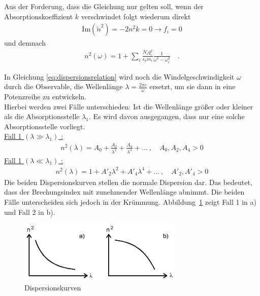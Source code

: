 Aus der Forderung, dass die Gleichung nur gelten soll, wenn der Absorptionskoeffizient $k$ verschwindet folgt wiederum direkt
\begin{align}
\text{Im}\left( \tilde{n}^2 \right) = -2 n^2 k = 0 \rightarrow f_i = 0
\end{align}
und demnach
\begin{align} \label{eq:dispersionsrelation}
n^2(\omega) = 1 + \sum_{i} \frac{N_i q_i^2}{\epsilon_0 m_i} \frac{1}{\omega^2 - \omega_i^2}  \quad.
\end{align}
\clearpage

In Gleichung \eqref{eq:dispersionsrelation} wird noch die Windelgeschwindigkeit $\omega$ durch die Observable, die Wellenlänge $\lambda  = \frac{2 \pi c}{\omega}$ ersetzt, um sie dann in eine Potenzreihe zu entwickeln. \\
Hierbei werden zwei Fälle unterschieden: Ist die Wellenlänge größer oder kleiner als die Absorptionsstelle $\lambda_1$. Es wird davon ausgegangen, dass nur eine solche Absorptionsstelle vorliegt. \\
\underline{Fall 1 $(\lambda \gg \lambda_1)$ :}  \\
\begin{align}
n^2(\lambda) = A_0 + \frac{A_2}{\lambda^2} + \frac{A_4}{\lambda^4} + ... \ , \quad A_0, A_2, A_4 > 0
\end{align}
\underline{Fall 1 $(\lambda \ll \lambda_1)$ :}  \\
\begin{align}
n^2(\lambda) = 1 + A'_2 \lambda^2 + A'_4 \lambda^4 + ... \ , \quad A'_2, A'_4 > 0
\end{align}
Die beiden Dispersionskurven stellen die normale Dispersion dar. Das bedeutet, dass der Brechungsindex mit zunehmender Wellenlänge abnimmt. Die beiden Fälle unterscheiden sich jedoch in der Krümmung. Abbildung~\ref{fig:dispersionskurven} zeigt Fall 1 in a) und Fall 2 in b).

\begin{figure}[h!]
	\centering
	\includegraphics[width=0.7\textwidth]{Theorie.png}
	\caption{Dispersionskurven}
	\label{fig:dispersionskurven}
\end{figure}